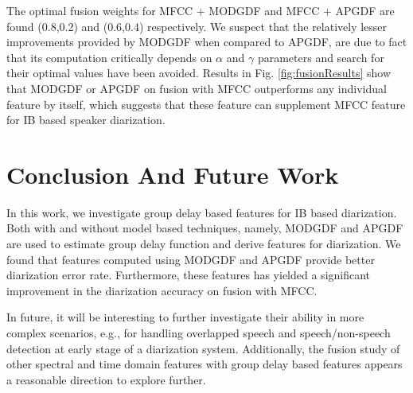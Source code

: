 \documentclass[conference]{IEEEtran}
\begin{document}
The optimal fusion weights for MFCC + MODGDF and MFCC + APGDF are found
(0.8,0.2) and (0.6,0.4) respectively. We suspect that the relatively lesser
improvements provided by MODGDF when compared to APGDF, are due to fact that its
computation critically depends on $\alpha$ and $\gamma$ parameters and search
for their optimal values have been avoided.  Results in Fig.
\ref{fig:fusionResults} show that MODGDF or APGDF on fusion with MFCC
outperforms any individual feature by itself, which suggests that these
feature can supplement MFCC feature for IB based speaker diarization.

\section{Conclusion And Future Work}
\label{conclude}

In this work, we investigate group delay based features for IB based
diarization. Both with and without model based techniques, namely,
MODGDF and APGDF are used to estimate group delay function and derive features for diarization. 
We found that features computed using MODGDF and APGDF provide better diarization error rate. 
Furthermore, these features has yielded a significant improvement in the diarization accuracy 
on fusion with MFCC. 

In future, it will be interesting to further investigate their ability in
more complex scenarios, e.g., for handling overlapped speech and speech/non-speech
detection at early stage of a diarization system. Additionally, the fusion study of
other spectral and time domain features with group delay based features appears
a reasonable direction to explore further. 



\end{document}
